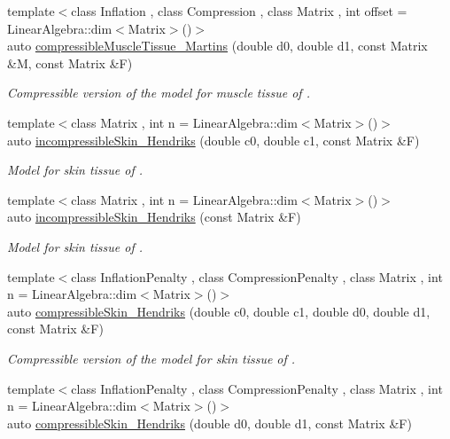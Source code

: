 \begin{DoxyCompactItemize}
{\footnotesize template$<$class Inflation , class Compression , class Matrix , int offset = Linear\+Algebra\+::dim$<$\+Matrix$>$()$>$ }\\auto \hyperlink{group__Biomechanics_ga46a70ccb2285e12addad87b6a8aaaae8}{compressible\+Muscle\+Tissue\+\_\+\+Martins} (double d0, double d1, const Matrix \&M, const Matrix \&F)
\begin{DoxyCompactList}\small\item\em Compressible version of the model for muscle tissue of \cite{Martins1998}. \end{DoxyCompactList}\item 
{\footnotesize template$<$class Matrix , int n = Linear\+Algebra\+::dim$<$\+Matrix$>$()$>$ }\\auto \hyperlink{group__Biomechanics_gaa20bf15ef6976d64d89490429035b2c4}{incompressible\+Skin\+\_\+\+Hendriks} (double c0, double c1, const Matrix \&F)
\begin{DoxyCompactList}\small\item\em Model for skin tissue of \cite{Hendriks2005}. \end{DoxyCompactList}\item 
{\footnotesize template$<$class Matrix , int n = Linear\+Algebra\+::dim$<$\+Matrix$>$()$>$ }\\auto \hyperlink{group__Biomechanics_gad8653218bd2afb4e3cfd601a5142956c}{incompressible\+Skin\+\_\+\+Hendriks} (const Matrix \&F)
\begin{DoxyCompactList}\small\item\em Model for skin tissue of \cite{Hendriks2005}. \end{DoxyCompactList}\item 
{\footnotesize template$<$class Inflation\+Penalty , class Compression\+Penalty , class Matrix , int n = Linear\+Algebra\+::dim$<$\+Matrix$>$()$>$ }\\auto \hyperlink{group__Biomechanics_ga07b4c52c6ecf7e72f73ab5832fb262cd}{compressible\+Skin\+\_\+\+Hendriks} (double c0, double c1, double d0, double d1, const Matrix \&F)
\begin{DoxyCompactList}\small\item\em Compressible version of the model for skin tissue of \cite{Hendriks2005}. \end{DoxyCompactList}\item 
{\footnotesize template$<$class Inflation\+Penalty , class Compression\+Penalty , class Matrix , int n = Linear\+Algebra\+::dim$<$\+Matrix$>$()$>$ }\\auto \hyperlink{group__Biomechanics_ga42721e772b7eada1b0bca98247ad440f}{compressible\+Skin\+\_\+\+Hendriks} (double d0, double d1, const Matrix \&F)

\end{DoxyCompactItemize}
